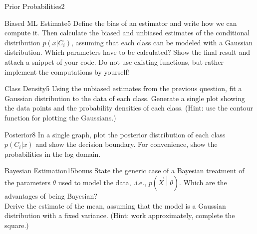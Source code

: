 \begin{questions}
\begin{question}{Prior Probabilities}{2}
\end{question}



\begin{question}{Biased ML Estimate}{5}
Define the bias of an estimator and write how we can compute it.
Then calculate the biased and unbiased estimates of the conditional distribution $p(x|C_i)$, assuming that each class can be modeled with a Gaussian distribution. Which parameters have to be calculated?
Show the final result and attach a snippet of your code.
Do not use existing functions, but rather implement the computations by yourself!

\begin{answer}

\end{answer}

\end{question}



\begin{question}{Class Density}{5}
Using the unbiased estimates from the previous question, fit a Gaussian distribution to the data of each class. Generate a single plot showing the data points and the probability densities of each class.
(Hint: use the contour function for plotting the Gaussians.) 

\begin{answer}

\end{answer}

\end{question}


\begin{question}{Posterior}{8}
In a single graph, plot the posterior distribution of each class $p(C_i|x)$ 
and show the decision boundary. For convenience, show the probabilities
in the log domain.

\begin{answer}

\end{answer}

\end{question}


\begin{question}{Bayesian Estimation}{15}{bonus}
State the generic case of a Bayesian treatment of the parameters $\theta$ used to model the data, .i.e., $p(\vec X \middle | \theta )$. 
Which are the advantages of being Bayesian? 
\\ Derive the estimate of the mean, assuming that the model is a Gaussian distribution with a fixed variance. (Hint: work approximately, complete the square.)


\begin{answer}
\end{answer}

\end{question}

\end{questions}
